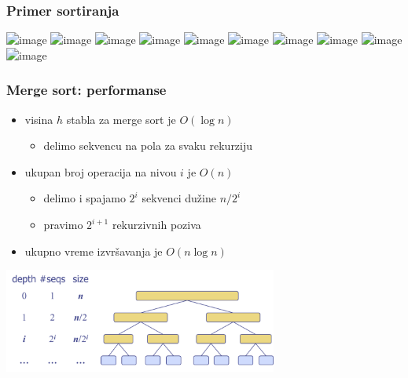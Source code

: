 \documentclass[compress,aspectratio=169]{beamer}
\begin{document}
\begin{frame}[fragile]
  \frametitle{Primer sortiranja}
  \begin{itemize}
  \end{itemize}
  \begin{center}
    \includegraphics<1>[width=11cm]{asp-12-pic03.png}
    \includegraphics<2>[width=11cm]{asp-12-pic04.png}
    \includegraphics<3>[width=11cm]{asp-12-pic05.png}
    \includegraphics<4>[width=11cm]{asp-12-pic06.png}
    \includegraphics<5>[width=11cm]{asp-12-pic07.png}
    \includegraphics<6>[width=11cm]{asp-12-pic08.png}
    \includegraphics<7>[width=11cm]{asp-12-pic09.png}
    \includegraphics<8>[width=11cm]{asp-12-pic10.png}
    \includegraphics<9>[width=11cm]{asp-12-pic11.png}
    \includegraphics<10>[width=11cm]{asp-12-pic12.png}
  \end{center}
\end{frame}

\begin{frame}[fragile]
  \frametitle{Merge sort: performanse}
  \begin{itemize}
    \item visina $h$ stabla za merge sort je $O(\log n)$
    \begin{itemize}
      \item delimo sekvencu na pola za svaku rekurziju
    \end{itemize}
    \item ukupan broj operacija na nivou $i$ je $O(n)$
    \begin{itemize}
      \item delimo i spajamo $2^i$ sekvenci dužine $n/2^i$
      \item pravimo $2^{i+1}$ rekurzivnih poziva
    \end{itemize}
    \item ukupno vreme izvršavanja je $O(n\log n)$
  \end{itemize}
  \begin{center}
    \includegraphics[width=9cm]{asp-12-pic13.png}
  \end{center}
\end{frame}
\end{document}
